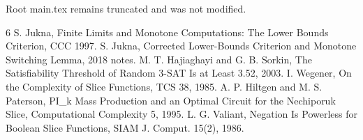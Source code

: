 \documentclass[11pt]{article}
\begin{document}
Root main.tex remains truncated and was not modified.

\begin{thebibliography}{6}
 S. Jukna, Finite Limits and Monotone Computations: The Lower Bounds Criterion, CCC 1997.
 S. Jukna, Corrected Lower-Bounds Criterion and Monotone Switching Lemma, 2018 notes.
 M. T. Hajiaghayi and G. B. Sorkin, The Satisfiability Threshold of Random 3-SAT Is at Least 3.52, 2003.
 I. Wegener, On the Complexity of Slice Functions, TCS 38, 1985.
 A. P. Hiltgen and M. S. Paterson, PI_k Mass Production and an Optimal Circuit for the Nechiporuk Slice, Computational Complexity 5, 1995.
 L. G. Valiant, Negation Is Powerless for Boolean Slice Functions, SIAM J. Comput. 15(2), 1986.
\end{thebibliography}
\end{document}
